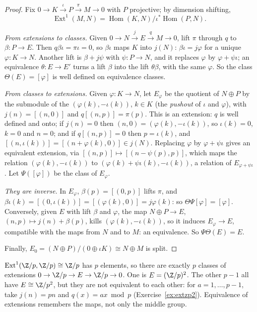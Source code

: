 \begin{proof}
Fix $0\to K\xrightarrow\iota P\xrightarrow\pi M\to0$ with $P$ projective; by dimension shifting,
\[
\operatorname{Ext}^1(M,N)=\operatorname{Hom}(K,N)/\iota^*\operatorname{Hom}(P,N).
\]

\emph{From extensions to classes.} Given $0\to N\xrightarrow jE\xrightarrow qM\to0$, lift $\pi$ through $q$ to $\beta\colon P\to E$. Then $q\beta\iota=\pi\iota=0$, so $\beta\iota$ maps $K$ into $j(N)$: $\beta\iota=j\varphi$ for a unique
$\varphi\colon K\to N$. Another lift is $\beta+j\psi$ with $\psi\colon P\to N$, and it replaces $\varphi$ by $\varphi+\psi\iota$; an equivalence $\theta\colon E\to E'$ turns a lift $\beta$ into the lift $\theta\beta$, with the same $\varphi$.
So the class $\Theta(E)=[\varphi]$ is well defined on equivalence classes.

\emph{From classes to extensions.} Given $\varphi\colon K\to N$, let $E_\varphi$ be the quotient of $N\oplus P$ by the submodule of the $(\varphi(k),-\iota(k))$, $k\in K$ (the \emph{pushout} of $\iota$ and $\varphi$), with $j(n)=[(n,0)]$ and
$q[(n,p)]=\pi(p)$. This is an extension: $q$ is well defined and onto; if $j(n)=0$ then $(n,0)=(\varphi(k),-\iota(k))$, so $\iota(k)=0$, $k=0$ and $n=0$; and if $q[(n,p)]=0$ then $p=\iota(k)$, and
$[(n,\iota(k))]=[(n+\varphi(k),0)]\in j(N)$. Replacing $\varphi$ by $\varphi+\psi\iota$ gives an equivalent extension, via $[(n,p)]\mapsto[(n-\psi(p),p)]$, which maps the relation $(\varphi(k),-\iota(k))$ to $(\varphi(k)+\psi\iota(k),-\iota(k))$,
a relation of $E_{\varphi+\psi\iota}$. Let $\Psi([\varphi])$ be the class of $E_\varphi$.

\emph{They are inverse.} In $E_\varphi$, $\beta(p)=[(0,p)]$ lifts $\pi$, and $\beta\iota(k)=[(0,\iota(k))]=[(\varphi(k),0)]=j\varphi(k)$: so $\Theta\Psi[\varphi]=[\varphi]$. Conversely, given $E$ with lift $\beta$ and $\varphi$, the map
$N\oplus P\to E$, $(n,p)\mapsto j(n)+\beta(p)$, kills $(\varphi(k),-\iota(k))$, so it induces $E_\varphi\to E$, compatible with the maps from $N$ and to $M$: an equivalence. So $\Psi\Theta(E)=E$.

Finally, $E_0=(N\oplus P)/(0\oplus\iota K)\cong N\oplus M$ is split.
\end{proof}

\begin{example}\label{ex:extzp}
$\operatorname{Ext}^1(\Z/p,\Z/p)\cong\Z/p$ has $p$ elements, so there are exactly $p$ classes of extensions $0\to\Z/p\to E\to\Z/p\to0$. One is $E=(\Z/p)^2$. The other $p-1$ all have $E\cong\Z/p^2$, but they are not
equivalent to each other: for $a=1,\dots,p-1$, take $j(n)=pn$ and $q(x)=ax\bmod p$ (Exercise~\ref{ex:extzp2}). Equivalence of extensions remembers the maps, not only the middle group.
\end{example}

